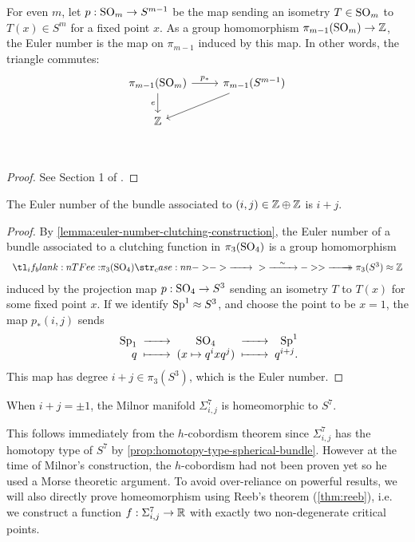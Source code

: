 \begin{lemma}\label{lemma:euler-number-clutching-construction}
	For even $m$, let $p : \mathrm{SO}_m \to S^{m-1}$ be the map sending an isometry $T\in \mathrm{SO}_m$ to $T(x)\in S^m$ for a fixed point $x$. As a group homomorphism $\pi_{m-1}(\mathrm{SO}_m)\to \mathbb{Z}$, the Euler number is the map on $\pi_{m-1}$ induced by this map. In other words, the triangle commutes:
	\[
		\begin{tikzcd}
			\pi_{m-1}(\SO_m) & \pi_{m-1}(S^{m-1})\\
			\Z &\\
			\arrow["e"', from=1-1, to=2-1]
			\arrow["p_*", from=1-1, to=1-2]
			\arrow[from=1-2, to=2-1]
		\end{tikzcd}
	\]
\end{lemma}
\begin{proof}
	See Section 1 of \cite{levine1985lectures}.
\end{proof}

\begin{proposition}\label{prop:euler-number-of-milnor-manifold}
	The Euler number of the bundle associated to $(i,j)\in \mathbb{Z}\oplus \mathbb{Z}$ is $i+j$.
\end{proposition}
\begin{proof}
	By \cref{lemma:euler-number-clutching-construction}, the Euler number of a bundle associated to a clutching function in $\pi_3(\mathrm{SO}_4)$ is a group homomorphism
	\[
		\lkxfunc{e}{\pi_3(\SO_4)}{\pi_3(S^3)\cong \Z}
	\]
	induced by the projection map $p : \mathrm{SO}_4 \to S^3$ sending an isometry $T$ to $T(x)$ for some fixed point $x$.
	If we identify $\mathrm{Sp}^1\approx S^3$, and choose the point to be $x=1$, the map $p_*(i,j)$ sends
	\[
		\begin{array}{r@{\;}c@{\;}c@{\;}r@{\;}r@{\;}r}
			\Sp_1 & \lkxto     & \SO_4              & \lkxto     & \Sp^1    \\
			q     & \lkxmapsto & (x\mapsto q^ixq^j) & \lkxmapsto & q^{i+j}.
		\end{array}
	\]
	This map has degree $i+j\in\pi_3(S^3)$, which is the Euler number.
\end{proof}

\begin{proposition}\label{prop:milnor-spheres-homeomorphic-to-spheres}
	When $i+j=\pm 1$, the Milnor manifold $\Sigma_{i,j}^7$ is homeomorphic to $S^7$.
\end{proposition}

This follows immediately from the $h$-cobordism theorem since $\Sigma_{i,j}^7$ has the homotopy type of $S^7$ by \cref{prop:homotopy-type-spherical-bundle}. However at the time of Milnor's construction, the $h$-cobordism had not been proven yet so he used a Morse theoretic argument. To avoid over-reliance on powerful results, we will also directly prove homeomorphism using Reeb's theorem (\cref{thm:reeb}), i.e. we construct a function $f : \Sigma_{i,j}^7 \to \mathbb{R}$ with exactly two non-degenerate critical points.


